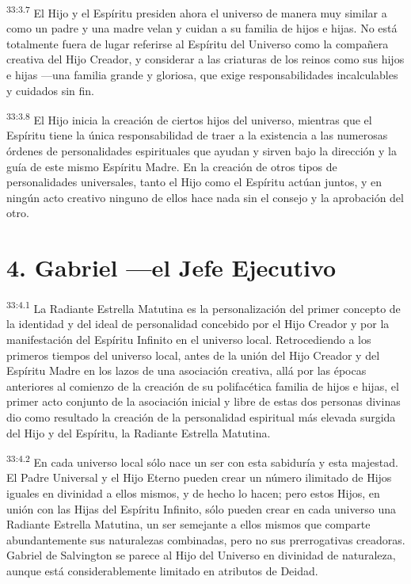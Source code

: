 \par
\textsuperscript{33:3.7} El Hijo y el Espíritu presiden ahora el universo de manera muy similar a como un padre y una madre velan y cuidan a su familia de hijos e hijas. No está totalmente fuera de lugar referirse al Espíritu del Universo como la compañera creativa del Hijo Creador, y considerar a las criaturas de los reinos como sus hijos e hijas ---una familia grande y gloriosa, que exige responsabilidades incalculables y cuidados sin fin.

\par
\textsuperscript{33:3.8} El Hijo inicia la creación de ciertos hijos del universo, mientras que el Espíritu tiene la única responsabilidad de traer a la existencia a las numerosas órdenes de personalidades espirituales que ayudan y sirven bajo la dirección y la guía de este mismo Espíritu Madre. En la creación de otros tipos de personalidades universales, tanto el Hijo como el Espíritu actúan juntos, y en ningún acto creativo ninguno de ellos hace nada sin el consejo y la aprobación del otro.

\section*{4. Gabriel ---el Jefe Ejecutivo}
\par
\textsuperscript{33:4.1} La Radiante Estrella Matutina es la personalización del primer concepto de la identidad y del ideal de personalidad concebido por el Hijo Creador y por la manifestación del Espíritu Infinito en el universo local. Retrocediendo a los primeros tiempos del universo local, antes de la unión del Hijo Creador y del Espíritu Madre en los lazos de una asociación creativa, allá por las épocas anteriores al comienzo de la creación de su polifacética familia de hijos e hijas, el primer acto conjunto de la asociación inicial y libre de estas dos personas divinas dio como resultado la creación de la personalidad espiritual más elevada surgida del Hijo y del Espíritu, la Radiante Estrella Matutina.

\par
\textsuperscript{33:4.2} En cada universo local sólo nace un ser con esta sabiduría y esta majestad. El Padre Universal y el Hijo Eterno pueden crear un número ilimitado de Hijos iguales en divinidad a ellos mismos, y de hecho lo hacen; pero estos Hijos, en unión con las Hijas del Espíritu Infinito, sólo pueden crear en cada universo una Radiante Estrella Matutina, un ser semejante a ellos mismos que comparte abundantemente sus naturalezas combinadas, pero no sus prerrogativas creadoras. Gabriel de Salvington se parece al Hijo del Universo en divinidad de naturaleza, aunque está considerablemente limitado en atributos de Deidad.

